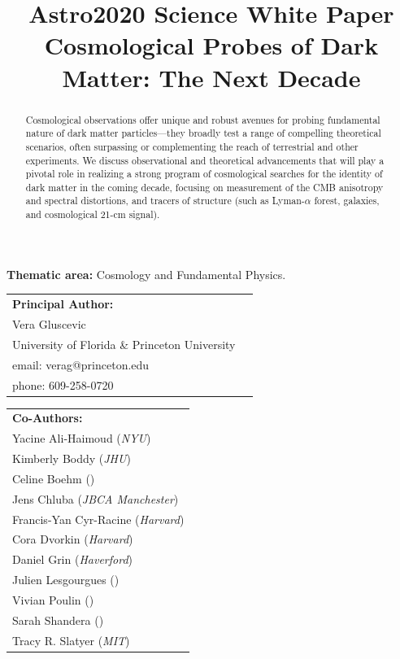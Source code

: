 \documentclass[12pt]{article}
\title{\textbf{Astro2020 Science White Paper}\\
\vspace{0.5cm}
Cosmological Probes of Dark Matter: The Next Decade}
\date{}
\author{}
\begin{document}
\maketitle
\vspace{-2cm}
\begin{center}
\textbf{Thematic area:} Cosmology and Fundamental Physics.     
\end{center}
\vspace{0.5cm}

{\begin{tabular}{ll}
\textbf{Principal Author:} \\
Vera Gluscevic & \\
University of Florida \& Princeton University & \\
email: verag@princeton.edu\\
phone: 609-258-0720 & 
\end{tabular}

\vspace{0.5cm}
{\begin{tabular}{l}
\textbf{Co-Authors:}\\
Yacine Ali-Haimoud (\textit{NYU})\\
Kimberly Boddy (\textit{JHU})\\
Celine Boehm (\textit{})\\
Jens Chluba (\textit{JBCA Manchester})\\
Francis-Yan Cyr-Racine (\textit{Harvard})\\
Cora Dvorkin (\textit{Harvard})\\
Daniel Grin (\textit{Haverford})\\
Julien Lesgourgues (\textit{})\\
Vivian Poulin (\textit{})\\
Sarah Shandera (\textit{})\\
Tracy R. Slatyer (\textit{MIT})\\
\end{tabular}}
}
\vspace{7mm}



\begin{abstract}
Cosmological observations offer unique and robust avenues for probing fundamental nature of dark matter particles---they broadly test a range of compelling theoretical scenarios, often surpassing or complementing the reach of terrestrial and other experiments.
We discuss observational and theoretical advancements that will play a pivotal role in realizing a strong program of cosmological searches for the identity of dark matter in the coming decade, focusing on measurement of the CMB anisotropy and spectral distortions, and tracers of structure (such as Lyman-$\alpha$ forest, galaxies, and cosmological 21-cm signal).

\end{abstract}
\end{document}
